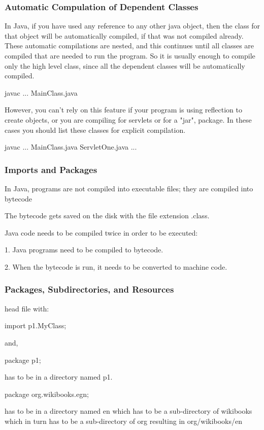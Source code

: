 \documentclass{article}
\begin{document}
\subsubsection{Automatic Compulation of Dependent Classes}

In Java, if you have used any reference to any other java object, then the class for that object will be automatically compiled, if that was not compiled already. These automatic compilations are nested, and this continues until all classes are compiled that are needed to run the program. So it is usually enough to compile only the high level class, since all the dependent classes will be automatically compiled.

javac ... MainClass.java

However, you can't rely on this feature if your program is using reflection to create objects, or you are compiling for servlets or for a "jar", package. In these cases you should list these classes for explicit compilation.

javac ... MainClass.java ServletOne.java ...

\subsubsection{Imports and Packages}

In Java, programs are not compiled into executable files; they are compiled into bytecode

The bytecode gets saved on the disk with the file extension .class.

Java code needs to be compiled twice in order to be executed:

1. Java programs need to be compiled to bytecode.

2. When the bytecode is run, it needs to be converted to machine code.

\subsubsection{Packages, Subdirectories, and Resources}
head file with:

import p1.MyClass;

and,

package p1;

has to be in a directory named p1.

package org.wikibooks.egn;

has to be in a directory named en which has to be a sub-directory of wikibooks which in turn has to be a sub-directory of org resulting in org/wikibooks/en
\end{document}
